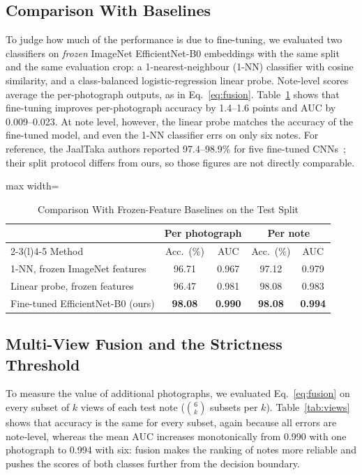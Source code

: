 \documentclass[journal]{IEEEtran}
\begin{document}
\subsection{Comparison With Baselines}
\label{sec:baselines}
To judge how much of the performance is due to fine-tuning, we evaluated two classifiers
on \emph{frozen} ImageNet EfficientNet-B0 embeddings with the same split and the same
evaluation crop: a 1-nearest-neighbour (1-NN) classifier with cosine similarity, and a
class-balanced logistic-regression linear probe. Note-level scores average the
per-photograph outputs, as in Eq.~\eqref{eq:fusion}. Table~\ref{tab:baselines} shows that
fine-tuning improves per-photograph accuracy by 1.4--1.6 points and AUC by 0.009--0.023.
At note level, however, the linear probe matches the accuracy of the fine-tuned model,
and even the 1-NN classifier errs on only six notes. For reference, the JaalTaka
authors reported 97.4--98.9\% for five fine-tuned CNNs~\cite{piyas2025jaaltaka}; their
split protocol differs from ours, so those figures are not directly comparable.

\begin{table}[!t]
\caption{Comparison With Frozen-Feature Baselines on the Test Split}
\label{tab:baselines}
\centering
\footnotesize
\setlength{\tabcolsep}{4pt}
\begin{adjustbox}{max width=\columnwidth}
\begin{tabular}{@{}lcccc@{}}
\toprule
& \multicolumn{2}{c}{Per photograph} & \multicolumn{2}{c}{Per note} \\
\cmidrule(lr){2-3}\cmidrule(l){4-5}
Method & Acc.\ (\%) & AUC & Acc.\ (\%) & AUC \\
\midrule
1-NN, frozen ImageNet features & 96.71 & 0.967 & 97.12 & 0.979 \\
Linear probe, frozen features  & 96.47 & 0.981 & 98.08 & 0.983 \\
Fine-tuned EfficientNet-B0 (ours) & \textbf{98.08} & \textbf{0.990} & \textbf{98.08} & \textbf{0.994} \\
\bottomrule
\end{tabular}
\end{adjustbox}
\end{table}

\subsection{Multi-View Fusion and the Strictness Threshold}
To measure the value of additional photographs, we evaluated Eq.~\eqref{eq:fusion} on
every subset of $k$ views of each test note ($\binom{6}{k}$ subsets per $k$).
Table~\ref{tab:views} shows that accuracy is the same for every subset, again because
all errors are note-level, whereas the mean AUC increases monotonically from 0.990 with
one photograph to 0.994 with six: fusion makes the ranking of notes more reliable and
pushes the scores of both classes further from the decision boundary.
\end{document}
